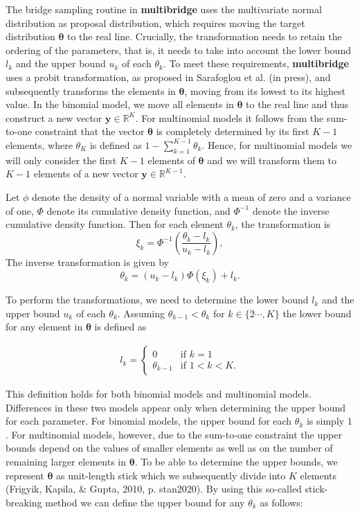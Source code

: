\documentclass[
  english,
  man,floatsintext]{apa6}
\begin{document}
The bridge sampling routine in \textbf{multibridge} uses the
multivariate normal distribution as proposal distribution, which
requires moving the target distribution \(\boldsymbol{\theta}\) to the
real line. Crucially, the transformation needs to retain the ordering of
the parameters, that is, it needs to take into account the lower bound
\(l_k\) and the upper bound \(u_k\) of each \(\theta_k\). To meet these
requirements, \textbf{multibridge} uses a probit transformation, as
proposed in Sarafoglou et al. (in press), and subsequently transforms the
elements in \(\boldsymbol{\theta}\), moving from its lowest to its
highest value. In the binomial model, we move all elements in
\(\boldsymbol{\theta}\) to the real line and thus construct a new vector
\(\boldsymbol{y} \in \mathbb{R}^{K}\). For multinomial models it follows
from the sum-to-one constraint that the vector \(\boldsymbol{\theta}\)
is completely determined by its first \(K - 1\) elements, where
\(\theta_K\) is defined as \(1 - \sum_{k = 1}^{K-1} \theta_k\). Hence,
for multinomial models we will only consider the first \(K - 1\)
elements of \(\boldsymbol{\theta}\) and we will transform them to
\(K - 1\) elements of a new vector
\(\boldsymbol{y} \in \mathbb{R}^{K - 1}\).

Let \(\phi\) denote the density of a normal variable with a mean of zero
and a variance of one, \(\Phi\) denote its cumulative density function,
and \(\Phi^{-1}\) denote the inverse cumulative density function. Then
for each element \(\theta_k\), the transformation is
\[\xi_k = \Phi^{-1}\left(\frac{\theta_k - l_k}{u_k - l_k}\right),\] The
inverse transformation is given by
\[\theta_k = (u_k - l_k) \Phi(\xi_k) + l_k.\]

To perform the transformations, we need to determine the lower bound
\(l_k\) and the upper bound \(u_k\) of each \(\theta_k\). Assuming
\(\theta_{k-1} < \theta_{k}\) for \(k \in \{2 \cdots, K\}\) the lower
bound for any element in \(\boldsymbol{\theta}\) is defined as

\begin{align*}
l_k = \left.
\begin{cases}
0 & \text{if } k = 1 \\
\theta_{k - 1} & \text{if } 1 < k < K.
\end{cases}
\right.
\end{align*}

This definition holds for both binomial models and multinomial models.
Differences in these two models appear only when determining the upper
bound for each parameter. For binomial models, the upper bound for each
\(\theta_k\) is simply \(1\). For multinomial models, however, due to
the sum-to-one constraint the upper bounds depend on the values of
smaller elements as well as on the number of remaining larger elements
in \(\boldsymbol{\theta}\). To be able to determine the upper bounds, we
represent \(\boldsymbol{\theta}\) as unit-length stick which we
subsequently divide into \(K\) elements (Frigyik, Kapila, \& Gupta, 2010, p. stan2020). By using this so-called
stick-breaking method we can define the upper bound for any \(\theta_k\)
as follows:
\end{document}
